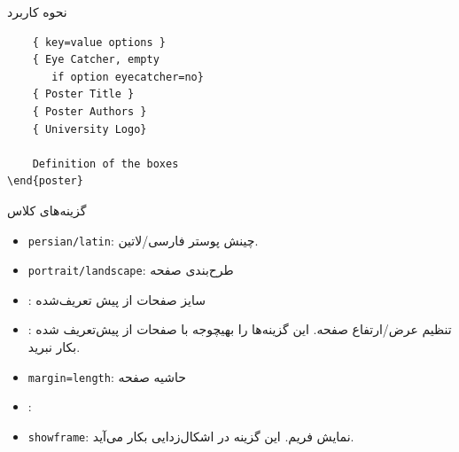 \documentclass[debug,a0paper]{xebaposter}
\begin{document}
\begin{poster}
\begin{posterbox}[name=usage,column=1,span=1,headershape=rounded,textborder=rectangle
,textborder=faded,headershade=shadelr,]{نحوه کاربرد}
\begin{latin}
\begin{verbatim}
    { key=value options }
    { Eye Catcher, empty 
       if option eyecatcher=no}
    { Poster Title }
    { Poster Authors }
    { University Logo}
    
    Definition of the boxes
\end{poster}
\end{verbatim}
\end{latin}
\end{posterbox}
\begin{posterbox}[name=classoption,column=2,span=1,headershape=rectangle,textborder=roundedsmall
,headershade=shaderl]
{گزینه‌های کلاس}
\begin{itemize}
    \item \texttt{persian/latin}:
     چینش پوستر فارسی/لاتین.%
    \item \texttt{portrait/landscape}: طرح‌بندی صفحه
    \item {}: سایز صفحات از پیش تعریف‌شده
    \item {}: تنظیم عرض/ارتفاع صفحه. 
    این گزینه‌ها را بهیچوجه با صفحات از پیش‌تعریف شده بکار نبرید.
    \item \texttt{margin=length}: حاشیه صفحه
    \item {}:
    \item \texttt{showframe}: نمایش فریم. این گزینه‌ در اشکال‌زدایی بکار می‌آید.
\end{itemize}
\end{posterbox}


\end{poster}
\end{document}

